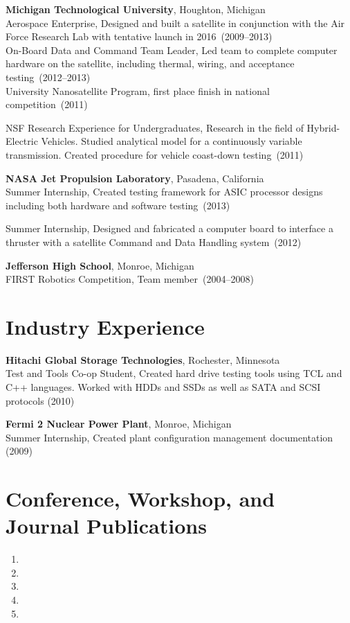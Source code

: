 \documentclass{article}
\begin{document}
{\bf Michigan Technological University}, Houghton, Michigan \\
Aerospace Enterprise, Designed and built a satellite in conjunction with the
Air Force Research Lab with tentative launch in 2016~(2009--2013) \\
On-Board Data and Command Team Leader, Led team to complete computer hardware
on the satellite, including thermal, wiring, and acceptance testing~(2012--2013) \\
University Nanosatellite Program, first place finish in national competition~(2011)

NSF Research Experience for Undergraduates, Research in the field of
Hybrid-Electric Vehicles. Studied analytical model for a continuously variable
transmission. Created procedure for vehicle coast-down testing~(2011)


{\bf NASA Jet Propulsion Laboratory}, Pasadena, California \\
Summer Internship, Created testing framework for ASIC processor designs
including both hardware and software testing~(2013)

Summer Internship, Designed and fabricated a computer board to interface a
thruster with a satellite Command and Data Handling system~(2012)

{\bf Jefferson High School}, Monroe, Michigan \\
FIRST Robotics Competition, Team member~(2004--2008)


\section*{Industry Experience}
\vspace{-6pt}

{\bf Hitachi Global Storage Technologies}, Rochester, Minnesota \\
Test and Tools Co-op Student, Created hard drive testing tools using TCL and
C++ languages. Worked with HDDs and SSDs as well as SATA and SCSI protocols (2010)

{\bf Fermi 2 Nuclear Power Plant}, Monroe, Michigan \\
Summer Internship, Created plant configuration management documentation (2009)


\section*{Conference, Workshop, and Journal Publications}
\begin{enumerate}
  \item {}
  \item {}
  \item {}
  \item {}
  \item {}
\end{enumerate}
\end{document}
